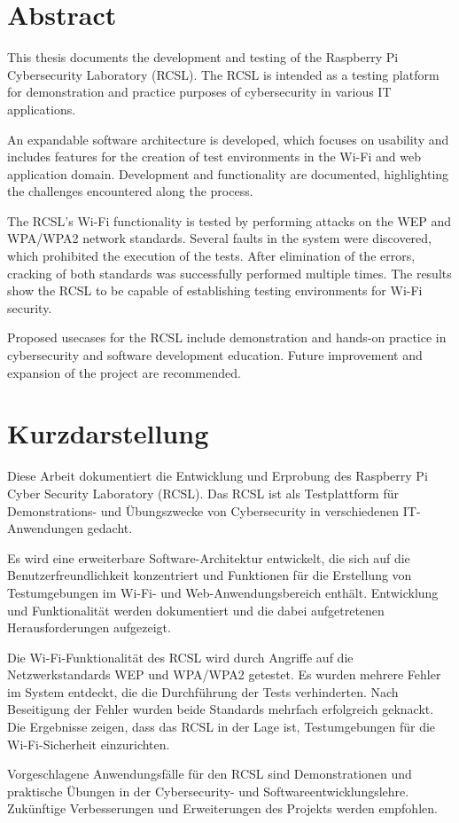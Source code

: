 \thispagestyle{empty}

\section*{Abstract}\label{sec:abstract}
This thesis documents the development and testing of the Raspberry Pi Cybersecurity Laboratory (RCSL).
The RCSL is intended as a testing platform for demonstration and practice purposes of cybersecurity in various IT applications.

An expandable software architecture is developed, which focuses on usability and includes features for the creation of test environments in the Wi-Fi and web application domain.
Development and functionality are documented, highlighting the challenges encountered along the process.

The RCSL's Wi-Fi functionality is tested by performing attacks on the WEP and WPA/WPA2 network standards.
Several faults in the system were discovered, which prohibited the execution of the tests.
After elimination of the errors, cracking of both standards was successfully performed multiple times.
The results show the RCSL to be capable of establishing testing environments for Wi-Fi security.

Proposed usecases for the RCSL include demonstration and hands-on practice in cybersecurity and software development education.
Future improvement and expansion of the project are recommended.


\newpage

\section*{Kurzdarstellung}
\label{sec:kurzdarstellung}
Diese Arbeit dokumentiert die Entwicklung und Erprobung des Raspberry Pi Cyber Security Laboratory (RCSL).
Das RCSL ist als Testplattform für Demonstrations- und Übungszwecke von Cybersecurity in verschiedenen IT-Anwendungen gedacht.

Es wird eine erweiterbare Software-Architektur entwickelt, die sich auf die Benutzerfreundlichkeit konzentriert und Funktionen für die Erstellung von Testumgebungen im Wi-Fi- und Web-Anwendungsbereich enthält.
Entwicklung und Funktionalität werden dokumentiert und die dabei aufgetretenen Herausforderungen aufgezeigt.

Die Wi-Fi-Funktionalität des RCSL wird durch Angriffe auf die Netzwerkstandards WEP und WPA/WPA2 getestet.
Es wurden mehrere Fehler im System entdeckt, die die Durchführung der Tests verhinderten.
Nach Beseitigung der Fehler wurden beide Standards mehrfach erfolgreich geknackt.
Die Ergebnisse zeigen, dass das RCSL in der Lage ist, Testumgebungen für die Wi-Fi-Sicherheit einzurichten.

Vorgeschlagene Anwendungsfälle für den RCSL sind Demonstrationen und praktische Übungen in der Cybersecurity- und Softwareentwicklungslehre.
Zukünftige Verbesserungen und Erweiterungen des Projekts werden empfohlen.